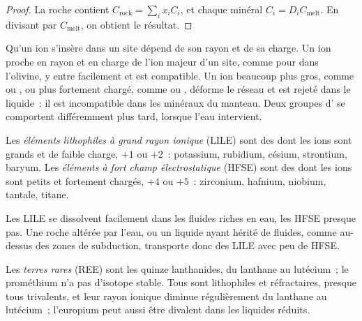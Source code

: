 \begin{proof}
La roche contient $C_{\mathrm{rock}} = \sum_i x_i C_i$, et chaque minéral
$C_i = D_i C_{\mathrm{melt}}$. En divisant par $C_{\mathrm{melt}}$, on obtient le résultat.
\end{proof}

Qu'un ion s'insère dans un site dépend de son rayon et de sa charge. Un ion
proche en rayon et en charge de l'ion majeur d'un site, comme  pour
 dans l'olivine, y entre facilement et est compatible. Un ion
beaucoup plus gros, comme  ou , ou plus fortement chargé, comme
 ou , déforme le réseau et est rejeté dans le liquide~:
il est incompatible dans les minéraux du manteau. Deux groupes d' se comportent différemment plus tard, lorsque l'eau intervient.

\begin{definition}
\label{def:b2:elements-in-the-earth:lile-hfse}
Les \emph{éléments lithophiles à grand rayon ionique}
(LILE) sont des  dont les ions sont grands
et de faible charge, $+1$ ou $+2$~: potassium, rubidium, césium, strontium,
baryum. Les \emph{éléments à fort champ électrostatique}
(HFSE) sont des  dont les ions sont petits
et fortement chargés, $+4$ ou $+5$~: zirconium, hafnium, niobium, tantale, titane.
\end{definition}

Les LILE se dissolvent facilement dans les fluides riches en eau, les HFSE presque
pas. Une roche altérée par l'eau, ou un liquide ayant hérité de fluides, comme
au-dessus des zones de subduction, transporte donc des LILE avec peu de HFSE.

\begin{definition}\label{def:b2:elements-in-the-earth:ree}
Les \emph{terres rares} (REE) sont les quinze
lanthanides, du lanthane au lutécium~; le prométhium n'a pas d'isotope
stable. Tous sont lithophiles et réfractaires, presque tous trivalents,
et leur rayon ionique diminue régulièrement du lanthane au lutécium~;
l'europium peut aussi être divalent dans les liquides réduits.
\end{definition}


